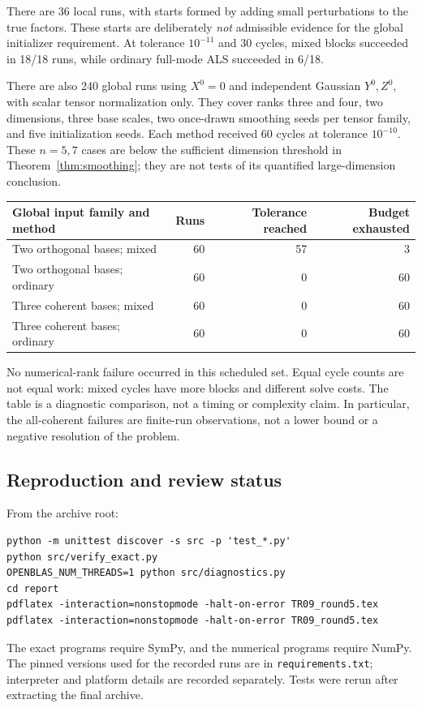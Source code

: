 \documentclass[11pt]{article}
\theoremstyle{remark}\newtheorem{remark}[theorem]{Remark}
\begin{document}
There are 36 local runs, with starts formed by adding small perturbations to the true factors. These starts are deliberately \emph{not} admissible evidence for the global initializer requirement. At tolerance $10^{-11}$ and 30 cycles, mixed blocks succeeded in 18/18 runs, while ordinary full-mode ALS succeeded in 6/18.

There are also 240 global runs using $X^0=0$ and independent Gaussian $Y^0,Z^0$, with scalar tensor normalization only. They cover ranks three and four, two dimensions, three base scales, two once-drawn smoothing seeds per tensor family, and five initialization seeds. Each method received 60 cycles at tolerance $10^{-10}$. These $n=5,7$ cases are below the sufficient dimension threshold in Theorem~\ref{thm:smoothing}; they are not tests of its quantified large-dimension conclusion.
\begin{center}
\begin{tabular}{lrrr}
\toprule
Global input family and method & Runs & Tolerance reached & Budget exhausted\\\midrule
Two orthogonal bases; mixed & 60 & 57 & 3\\
Two orthogonal bases; ordinary & 60 & 0 & 60\\
Three coherent bases; mixed & 60 & 0 & 60\\
Three coherent bases; ordinary & 60 & 0 & 60\\\bottomrule
\end{tabular}
\end{center}
No numerical-rank failure occurred in this scheduled set. Equal cycle counts are not equal work: mixed cycles have more blocks and different solve costs. The table is a diagnostic comparison, not a timing or complexity claim. In particular, the all-coherent failures are finite-run observations, not a lower bound or a negative resolution of the problem.

\subsection{Reproduction and review status}
From the archive root:
\begin{lstlisting}
python -m unittest discover -s src -p 'test_*.py'
python src/verify_exact.py
OPENBLAS_NUM_THREADS=1 python src/diagnostics.py
cd report
pdflatex -interaction=nonstopmode -halt-on-error TR09_round5.tex
pdflatex -interaction=nonstopmode -halt-on-error TR09_round5.tex
\end{lstlisting}
The exact programs require SymPy, and the numerical programs require NumPy. The pinned versions used for the recorded runs are in \texttt{requirements.txt}; interpreter and platform details are recorded separately. Tests were rerun after extracting the final archive.
\end{document}
